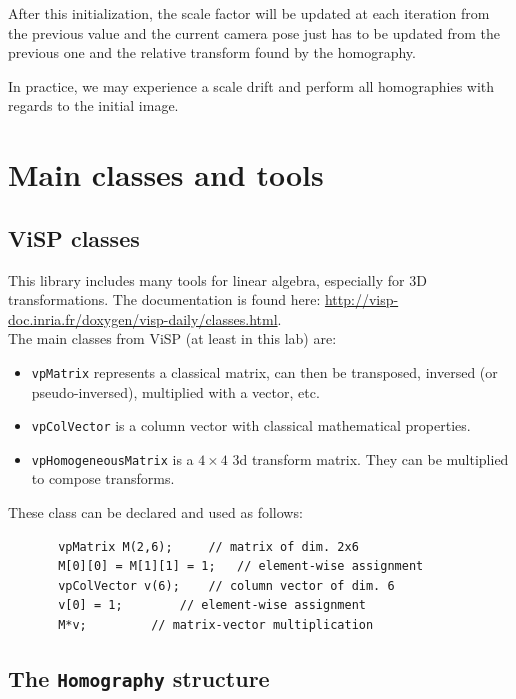 \documentclass{ecnreport}
\begin{document}
After this initialization, the scale factor will be updated at each iteration from the previous value and the current camera pose just has to be updated from the previous one and the relative
transform found by the homography.

In practice, we may experience a scale drift and perform all homographies with regards to the initial image.


\appendix
\section{Main classes and tools}\label{sec:classes}

\subsection{ViSP classes}

This library includes many tools for linear algebra, especially for 3D transformations. 
The documentation is found here: \url{http://visp-doc.inria.fr/doxygen/visp-daily/classes.html}.\\
The main classes from ViSP (at least in this lab) are:
\begin{itemize}
\item \texttt{vpMatrix} represents a classical matrix, can then be transposed, inversed (or pseudo-inversed), multiplied with a vector, etc.
\item \texttt{vpColVector} is a column vector with classical mathematical properties.
\item \texttt{vpHomogeneousMatrix} is a $4\times 4$ 3d transform matrix. They can be multiplied to compose transforms.
\end{itemize}
These class can be declared and used as follows:
\begin{center}\cppstyle
\begin{lstlisting}
       vpMatrix M(2,6); 	// matrix of dim. 2x6
       M[0][0] = M[1][1] = 1;	// element-wise assignment
       vpColVector v(6);	// column vector of dim. 6
       v[0] = 1;		// element-wise assignment
       M*v;			// matrix-vector multiplication
\end{lstlisting}
\end{center}

\subsection{The \texttt{Homography} structure}
\label{sec:homog}
\end{document}
